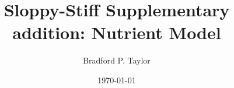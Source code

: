 \documentclass[preprint,authoryear,12pt]{elsarticle}
\begin{document}

\title{Sloppy-Stiff Supplementary addition: Nutrient Model}


\author[physics]{Bradford P. Taylor}
\address[physics]{School of Physics, Georgia Institute of Technology, Atlanta, GA, USA}


\date{\today}


\maketitle

\end{document}
